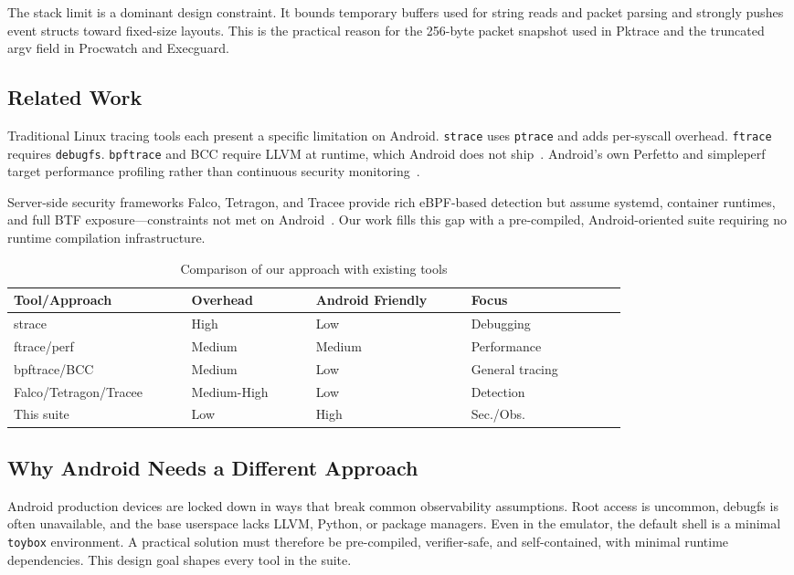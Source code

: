 \documentclass[conference]{IEEEtran}
\begin{document}
The stack limit is a dominant design constraint. It bounds temporary buffers used for string reads and packet parsing and strongly pushes event structs toward fixed-size layouts. This is the practical reason for the 256-byte packet snapshot used in Pktrace and the truncated argv field in Procwatch and Execguard.

\subsection{Related Work}
Traditional Linux tracing tools each present a specific limitation on Android. \texttt{strace} uses \texttt{ptrace} and adds per-syscall overhead. \texttt{ftrace} requires \texttt{debugfs}. \texttt{bpftrace} and BCC require LLVM at runtime, which Android does not ship~\cite{strace_doc,ftrace_doc,bpftrace_doc}. Android's own Perfetto and simpleperf target performance profiling rather than continuous security monitoring~\cite{android_perfetto,android_simpleperf}.

Server-side security frameworks Falco, Tetragon, and Tracee provide rich eBPF-based detection but assume systemd, container runtimes, and full BTF exposure---constraints not met on Android~\cite{falco_doc,tetragon_doc,tracee_doc}. Our work fills this gap with a pre-compiled, Android-oriented suite requiring no runtime compilation infrastructure.

\begin{table}[H]
  \centering
  \small
  \caption{Comparison of our approach with existing tools}
  \label{tab:comparison}
  \begin{tabular}{|p{0.22\linewidth}|p{0.16\linewidth}|p{0.20\linewidth}|p{0.20\linewidth}|}
    \hline
    \textbf{Tool/Approach} & \textbf{Overhead} & \textbf{Android Friendly} & \textbf{Focus} \\ \hline
    strace & High & Low & Debugging \\ \hline
    ftrace/perf & Medium & Medium & Performance \\ \hline
    bpftrace/BCC & Medium & Low & General tracing \\ \hline
    Falco/Tetragon/Tracee & Medium-High & Low & Detection \\ \hline
    This suite & Low & High & Sec./Obs. \\ \hline
  \end{tabular}
\end{table}

\subsection{Why Android Needs a Different Approach}
Android production devices are locked down in ways that break common observability assumptions. Root access is uncommon, debugfs is often unavailable, and the base userspace lacks LLVM, Python, or package managers. Even in the emulator, the default shell is a minimal \texttt{toybox} environment. A practical solution must therefore be pre-compiled, verifier-safe, and self-contained, with minimal runtime dependencies. This design goal shapes every tool in the suite.
\end{document}
